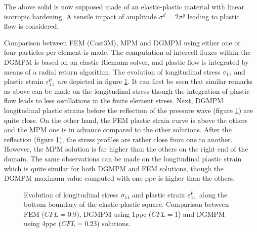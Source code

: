 The above solid is now supposed made of an elastic-plastic material with linear isotropic hardening. A tensile impact of amplitude $\sigma^d=2\sigma^y$ leading to plastic flow is considered. 

Comparison between FEM (Cast3M), MPM and DGMPM using either one or four particles per element is made.
The computation of intercell fluxes within the DGMPM is based on an elastic Riemann solver, and plastic flow is integrated by means of a radial return algorithm.
The evolution of longitudinal stress $\sigma_{11}$ and plastic strain $\varepsilon^p_{11}$ are depicted in figure \ref{fig:elastlines_stress}.
It can first be seen that similar remarks as above can be made on the longitudinal stress though the integration of plastic flow leads to less oscillations in the finite element stress.
Next, DGMPM longitudinal plastic strains before the reflection of the pressure wave (figure \ref{fig:elastlines_stress}) are quite close.
On the other hand, the FEM plastic strain curve is above the others and the MPM one is in advance compared to the other solutions.
After the reflection (figure \ref{fig:elastlines_stress}), the stress profiles are rather close from one to another.
However, the MPM solution is far higher than the others on the right end of the domain.
The same observations can be made on the longitudinal plastic strain which is quite similar for both DGMPM and FEM solutions, though the DGMPM maximum value computed with one ppc is higher than the others.

\begin{figure}[h!]
  { \label{subfig:2dplast1}}
  { \label{subfig:2dplast2}}
  
  \caption{Evolution of longitudinal stress $\sigma_{11}$ and plastic strain $\varepsilon^p_{11}$ along the bottom boundary of the elastic-plastic square. Comparison between FEM ($CFL=0.9$), DGMPM using 1ppc ($CFL=1$) and DGMPM using 4ppc ($CFL=0.23$) solutions.}
  \label{fig:elastlines_stress}
\end{figure}

